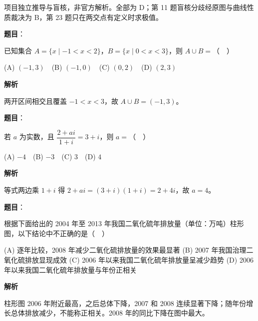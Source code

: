 

\begin{gktip}
项目独立推导与盲核，非官方解析。全部为 D；第 11 题盲核分歧经原图与曲线性质裁决为 B，第 23 题只在两交点有定义时求极值。
\end{gktip}

\begin{answer}

\textbf{题目}：

已知集合 $A=\{x\mid -1<x<2\}$，$B=\{x\mid 0<x<3\}$，则 $A\cup B=$（　）

(A) $(-1,3)$　(B) $(-1,0)$　(C) $(0,2)$　(D) $(2,3)$

\textbf{解析}

两开区间相交且覆盖 $-1<x<3$，故 $A\cup B=(-1,3)$。


\end{answer}
\begin{answer}

\textbf{题目}：

若 $a$ 为实数，且 $\dfrac{2+ai}{1+i}=3+i$，则 $a=$（　）

(A) $-4$　(B) $-3$　(C) $3$　(D) $4$

\textbf{解析}

等式两边乘 $1+i$ 得 $2+ai=(3+i)(1+i)=2+4i$，故 $a=4$。


\end{answer}
\begin{answer}

\textbf{题目}：

根据下面给出的 2004 年至 2013 年我国二氧化硫年排放量（单位：万吨）柱形图，以下结论中不正确的是（　）
\nopagebreak[4]
\begin{center}\end{center}
\nopagebreak[4]
(A) 逐年比较，2008 年减少二氧化硫排放量的效果最显著  
(B) 2007 年我国治理二氧化硫排放显现成效  
(C) 2006 年以来我国二氧化硫年排放量呈减少趋势  
(D) 2006 年以来我国二氧化硫年排放量与年份正相关

\textbf{解析}

柱形图 2006 年附近最高，之后总体下降，2007 和 2008 连续显著下降；随年份增长总体排放减少，不能称正相关。2008 年的同比下降在图中最大。


\end{answer}
